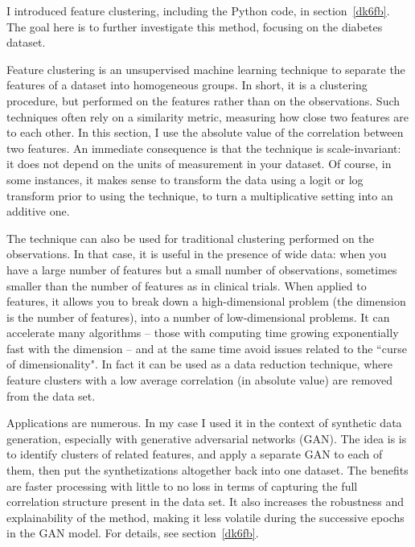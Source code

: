 \documentclass[oneside,10pt]{book}
\begin{document}
I introduced \textcolor{index}{feature clustering}, including the Python code, in section~\ref{dk6fb}. The goal here is
 to further investigate this method, focusing on the diabetes dataset.

Feature clustering is an unsupervised machine learning technique to separate the features of a dataset into homogeneous groups.
In short, it is a clustering procedure, but performed on the features rather than on the observations. Such techniques often
 rely on a similarity metric, measuring how close two features are to each other. In this section, I use the
 absolute value of the correlation between two features. An immediate consequence is that the technique is scale-invariant: it does not
 depend on the units of measurement in your dataset. Of course, in some instances, it makes sense to transform the data using a logit or
 log transform prior to using the technique, to turn a multiplicative setting into an additive one.

The technique can also be used for traditional clustering performed on the observations. In that case, it is useful in the presence of
wide data: when you have a large number of features but a small number of observations, sometimes smaller than the number of features
 as in clinical trials. When applied to features, it allows you to break down a high-dimensional problem (the dimension is the number of features), into a number of low-dimensional problems. It can accelerate many algorithms -- those with computing time growing exponentially  fast with the dimension -- and at the same time avoid issues related to the ``curse of dimensionality". In fact it can be used as a data reduction technique, where feature clusters with a low average correlation (in absolute value) are removed from the data set.





Applications are numerous. In my case I used it in the context of synthetic data generation, especially
 with generative adversarial networks (GAN). The idea is is to identify clusters of related features, and apply a separate GAN to each of them,
 then put the synthetizations altogether back into one dataset. The benefits are faster processing with little to no loss in terms of capturing
 the full correlation structure present in the data set. It also increases the robustness and explainability of the method, making it less volatile
 during the successive epochs in the GAN model.
 For details, see section~\ref{dk6fb}.
\end{document}
